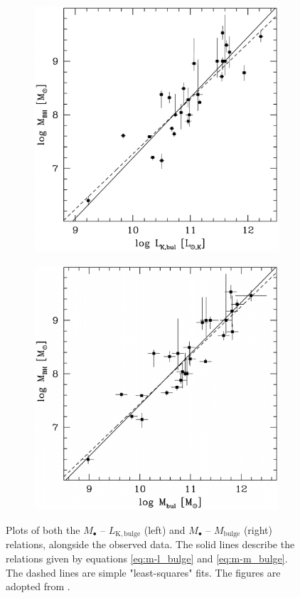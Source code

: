 \documentclass[english, twoside]{HYgradu}
\begin{document}
\begin{figure}
	\centering
	\begin{subfigure}[b]{0.49\textwidth}
		\includegraphics[width=\textwidth]{marconi_l-bul.png}
	\end{subfigure}
	\begin{subfigure}[b]{0.49\textwidth}
		\includegraphics[width=\textwidth]{marconi_m-bul_2.png}
	\end{subfigure}
	\caption{Plots of both the $M_\bullet$ – $L_\mathrm{K,bulge}$ (left) and $M_\bullet$ – $M_\mathrm{bulge}$ (right) relations, alongside the observed data. The solid lines describe the relations given by equations \ref{eq:m-l_bulge} and \ref{eq:m-m_bulge}. The dashed lines are simple "least-squares" fits. The figures are adopted from \cite{Marconi2003}.}
	\label{figure:m-bulge}
\end{figure}
\end{document}
